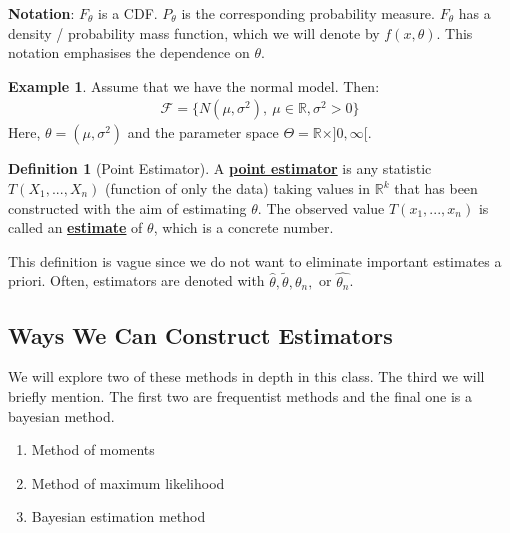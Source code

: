 \documentclass[11pt]{scrartcl}
\newcommand{\R}[0]{\mathbb{R}}
\theoremstyle{definition}
\newtheorem{definition}{Definition}
\newtheorem{ex}{Example}
\theoremstyle{remark}
\newcommand{\dfn}[1]{\textbf{\underline{#1}}}
\newcommand{\dist}[0]{\mathcal{F}}
\newcommand{\stat}[0]{T(X_1, ..., X_n )}
\begin{document}
\textbf{Notation}: $F_\theta$ is a CDF. $P_\theta$ is the corresponding probability measure. $F_\theta$ has a density / probability mass function, which we will denote by $f(x, \theta)$. This notation emphasises the dependence on $\theta$. 


\begin{ex}
Assume that we have the normal model. Then: 
\begin{align*}
	\dist = \{ N(\mu, \sigma^2),\ \mu \in \R, \sigma^2 > 0 \} 	
\end{align*}
	Here, $\theta = (\mu, \sigma^2)$ and the parameter space $\Theta = \R \times ]0, \infty[$. 
\end{ex}

\begin{definition}[Point Estimator]
	A \dfn{point estimator} is any statistic $\stat$ (function of only the data) taking values in $\R^k$ that has been constructed with the aim of estimating $\theta$. The observed value $T(x_1, ..., x_n)$ is called an \dfn{estimate} of $\theta$, which is a concrete number. 
\end{definition}

This definition is vague since we do not want to eliminate important estimates a priori. Often, estimators are denoted with $\hat{\theta}, \tilde{\theta}, \theta_n,$ or $ \hat{\theta_n}$. 


\subsection{Ways We Can Construct Estimators}
We will explore two of these methods in depth in this class. The third we will briefly mention. The first two are frequentist methods and the final one is a bayesian method. 
\begin{enumerate}[noitemsep]
	\item Method of moments
	\item Method of maximum likelihood 
	\item Bayesian estimation method 
\end{enumerate}
\end{document}
